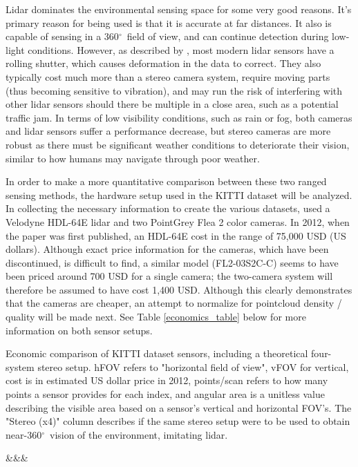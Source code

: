 \def \deg {$^{\circ}$\ } %

Lidar dominates the environmental sensing space for some very good reasons. It's primary reason for being used is that it is accurate at far distances. It also is capable of sensing in a 360\deg field of view, and can continue detection during low-light conditions. However, as described by \cite{broggi_sensors_2013}, most modern lidar sensors have a rolling shutter, which causes deformation in the data to correct. They also typically cost much more than a stereo camera system, require moving parts (thus becoming sensitive to vibration), and may run the risk of interfering with other lidar sensors should there be multiple in a close area, such as a potential traffic jam. In terms of low visibility conditions, such as rain or fog, both cameras and lidar sensors suffer a performance decrease, but stereo cameras are more robust as there must be significant weather conditions to deteriorate their vision, similar to how humans may navigate through poor weather.


In order to make a more quantitative comparison between these two ranged sensing methods, the hardware setup used in the KITTI dataset will be analyzed. In collecting the necessary information to create the various datasets, \cite{geiger_are_2012} used a Velodyne HDL-64E lidar and two PointGrey Flea 2 color cameras. In 2012, when the paper was first published, an HDL-64E cost in the range of 75,000 USD (US dollars). Although exact price information for the cameras, which have been discontinued, is difficult to find, a similar model (FL2-03S2C-C) seems to have been priced around 700 USD for a single camera; the two-camera system will therefore be assumed to have cost 1,400 USD. Although this clearly demonstrates that the cameras are cheaper, an attempt to normalize for pointcloud density / quality will be made next. See Table \ref{economics_table} below for more information on both sensor setups. 

\def \b #1{\textbf{#1}} 
\begin{table}[h]
	\centering
	\caption{Economic comparison of KITTI dataset sensors, including a theoretical four-system stereo setup. hFOV refers to "horizontal field of view", vFOV for vertical, cost is in estimated US dollar price in 2012, points/scan refers to how many points a sensor provides for each index, and angular area is a unitless value describing the visible area based on a sensor's vertical and horizontal FOV's. The "Stereo (x4)" column describes if the same stereo setup were to be used to obtain near-360\deg vision of the environment, imitating lidar.}
	\csvreader[tabular=|c|c|c|c|,
	separator=semicolon,
	table head=\hline \b{Property} & \b{Lidar} & \b{Stereo (x1)} & \b{Stereo (x4)} \\\hline,
	late after line=\\\hline
	]%
	{../media/economics_table.csv}{}
	{\csvcoli&\csvcolii&\csvcoliii&\csvcoliv}
	\label{economics_table}
\end{table}

